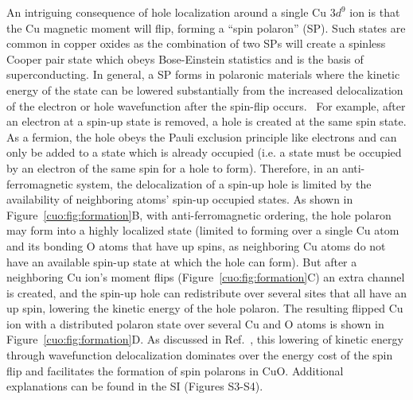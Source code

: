 An intriguing consequence of hole localization around a single Cu $3d^9$ ion is that the Cu magnetic moment will flip, forming a ``spin polaron'' (SP).\cite{de1962interactions,vigren1973mobility,mott1993polaron,chernyshev2003models,lu1990spin,yonemitsu1992sensitivity}
Such states are common in copper oxides as the combination of two SPs will create a spinless Cooper pair state which obeys Bose-Einstein statistics and is the basis of superconducting.\cite{mott1993polaron,alexandrov1994bipolarons} In general, a SP forms in polaronic materials where the kinetic energy of the state can be lowered substantially from the increased delocalization of the electron or hole wavefunction after the spin-flip occurs.~\cite{wood1992d} For example, after an electron at a spin-up state is removed, a hole is created at the same spin state. As a fermion, the hole obeys the Pauli exclusion principle like electrons and can only be added to a state which is already occupied (i.e. a state must be occupied by an electron of the same spin for a hole to form). Therefore, in an anti-ferromagnetic system, the delocalization of a spin-up hole is limited by the availability of neighboring atoms’ spin-up occupied states. As shown in Figure~\ref{cuo:fig:formation}B, with anti-ferromagnetic ordering, the hole polaron may form into a highly localized state (limited to forming over a single Cu atom and its bonding O atoms that have up spins, as neighboring Cu atoms do not have an available spin-up state at which the hole can form). But after a neighboring Cu ion's moment flips (Figure~\ref{cuo:fig:formation}C) an extra channel is created, and the spin-up hole can redistribute over several sites that all have an up spin, lowering the kinetic energy of the hole polaron. The resulting flipped Cu ion with a distributed polaron state over several Cu and O atoms is shown in Figure~\ref{cuo:fig:formation}D. As discussed in Ref.~\cite{wood1992d}, this lowering of kinetic energy through wavefunction delocalization dominates over the energy cost of the spin flip and facilitates the formation of  spin polarons in CuO. Additional explanations can be found in the SI (Figures S3-S4).

